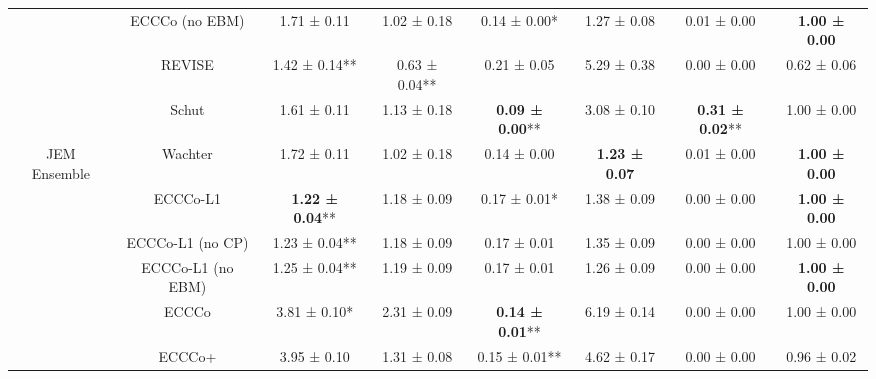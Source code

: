 \begin{table}
{\begin{tabular}[t]{cccccccc}
 & ECCCo (no EBM) & 1.71 ± 0.11\hphantom{*}\hphantom{*} & 1.02 ± 0.18\hphantom{*}\hphantom{*} & 0.14 ± 0.00*\hphantom{*} & 1.27 ± 0.08\hphantom{*}\hphantom{*} & 0.01 ± 0.00\hphantom{*}\hphantom{*} & \textbf{1.00 ± 0.00}\hphantom{*}\hphantom{*}\\

 & REVISE & 1.42 ± 0.14** & 0.63 ± 0.04** & 0.21 ± 0.05\hphantom{*}\hphantom{*} & 5.29 ± 0.38\hphantom{*}\hphantom{*} & 0.00 ± 0.00\hphantom{*}\hphantom{*} & 0.62 ± 0.06\hphantom{*}\hphantom{*}\\

 & Schut & 1.61 ± 0.11\hphantom{*}\hphantom{*} & 1.13 ± 0.18\hphantom{*}\hphantom{*} & \textbf{0.09 ± 0.00}** & 3.08 ± 0.10\hphantom{*}\hphantom{*} & \textbf{0.31 ± 0.02}** & 1.00 ± 0.00\hphantom{*}\hphantom{*}\\

\multirow[t]{-10}{*}{\centering\arraybackslash JEM Ensemble} & Wachter & 1.72 ± 0.11\hphantom{*}\hphantom{*} & 1.02 ± 0.18\hphantom{*}\hphantom{*} & 0.14 ± 0.00\hphantom{*}\hphantom{*} & \textbf{1.23 ± 0.07}\hphantom{*}\hphantom{*} & 0.01 ± 0.00\hphantom{*}\hphantom{*} & \textbf{1.00 ± 0.00}\hphantom{*}\hphantom{*}\\
\cmidrule{1-8}
 & ECCCo-L1 & \textbf{1.22 ± 0.04}** & 1.18 ± 0.09\hphantom{*}\hphantom{*} & 0.17 ± 0.01*\hphantom{*} & 1.38 ± 0.09\hphantom{*}\hphantom{*} & 0.00 ± 0.00\hphantom{*}\hphantom{*} & \textbf{1.00 ± 0.00}\hphantom{*}\hphantom{*}\\

 & ECCCo-L1 (no CP) & 1.23 ± 0.04** & 1.18 ± 0.09\hphantom{*}\hphantom{*} & 0.17 ± 0.01\hphantom{*}\hphantom{*} & 1.35 ± 0.09\hphantom{*}\hphantom{*} & 0.00 ± 0.00\hphantom{*}\hphantom{*} & 1.00 ± 0.00\hphantom{*}\hphantom{*}\\

 & ECCCo-L1 (no EBM) & 1.25 ± 0.04** & 1.19 ± 0.09\hphantom{*}\hphantom{*} & 0.17 ± 0.01\hphantom{*}\hphantom{*} & 1.26 ± 0.09\hphantom{*}\hphantom{*} & 0.00 ± 0.00\hphantom{*}\hphantom{*} & \textbf{1.00 ± 0.00}\hphantom{*}\hphantom{*}\\

 & ECCCo & 3.81 ± 0.10*\hphantom{*} & 2.31 ± 0.09\hphantom{*}\hphantom{*} & \textbf{0.14 ± 0.01}** & 6.19 ± 0.14\hphantom{*}\hphantom{*} & 0.00 ± 0.00\hphantom{*}\hphantom{*} & 1.00 ± 0.00\hphantom{*}\hphantom{*}\\

 & ECCCo+ & 3.95 ± 0.10\hphantom{*}\hphantom{*} & 1.31 ± 0.08\hphantom{*}\hphantom{*} & 0.15 ± 0.01** & 4.62 ± 0.17\hphantom{*}\hphantom{*} & 0.00 ± 0.00\hphantom{*}\hphantom{*} & 0.96 ± 0.02\hphantom{*}\hphantom{*}\\


\end{tabular}}
\end{table}
